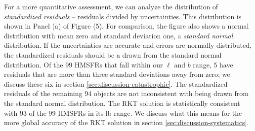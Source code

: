 For a more quantitative assessment, we can analyze the distribution of \emph{standardized residuals} -- residuals divided by uncertainties. This distribution is shown in Panel (a) of Figure (5). For comparison, the figure also shows a normal distribution with mean zero and standard deviation one, a \emph{standard normal} distribution. If the uncertainties are accurate and errors are normally distributed, the standardized residuals should be a drawn from the standard normal distribution. Of the 99 HMSFRs that fall within our $\ell$ and $b$ range, 5 have residuals that are more than three standard deviations away from zero; we discuss these six in section \ref{sec:discussion-catastrophic}. The standardized residuals of the remaining 94 objects are not inconsistent with being drawn from the standard normal distribution. The RKT solution is statistically consistent with 93 of the 99 HMSFRs in its lb range. We discuss what this means for the more global accuracy of the RKT solution in section \ref{sec:discussion-systematics}. 